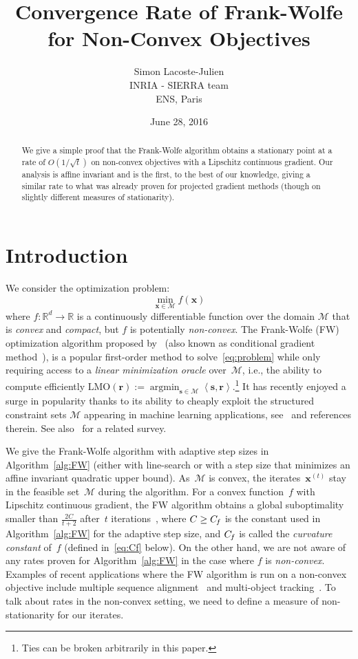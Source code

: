 \documentclass{article}
\title{Convergence Rate of Frank-Wolfe for Non-Convex Objectives}
\date{June 28, 2016}
\author{
Simon Lacoste-Julien \\
INRIA - SIERRA team\\
ENS, Paris 
}
\newcommand{\R}{\mathbb{R}}
\newcommand{\x}{\bm{x}}
\newcommand{\s}{\bm{s}}
\newcommand{\xt}{\bm{x}^{(t)}}
\DeclareMathOperator*{\argmin}{\arg\min}
\newcommand{\domain}{\mathcal{M}} %
\newcommand{\Cf}{C_{\hspace{-0.08em}f}}
\renewcommand{\r}{\bm{r}}
\newcommand{\innerProd}[2]{\left\langle #1 , #2 \right\rangle}
\newcommand{\0}{\mathbf{0}} %
\begin{document}
\maketitle

\begin{abstract}
We give a simple proof that the Frank-Wolfe algorithm obtains a stationary point at a rate of $O(1/\sqrt{t})$ on non-convex objectives with a Lipschitz continuous gradient. Our analysis is affine invariant and is the first, to the best of our knowledge, giving a similar rate to what was already proven for projected gradient methods (though on slightly different measures of stationarity).
\end{abstract}

%
%
%

\section{Introduction}
We consider the optimization problem:
\begin{equation} \label{eq:problem}
\min_{\x \in \domain} f(\x)
\end{equation}
where $f:\R^d\rightarrow\R$ is a continuously differentiable function over the domain $\domain$ that is \emph{convex} and \emph{compact}, but $f$ is potentially \emph{non-convex}. The Frank-Wolfe (FW) optimization algorithm proposed by~\citet{Frank:1956vp} (also known as conditional gradient method~\citep{demyanov1970approximate}), is a popular first-order method to solve~\eqref{eq:problem} while only requiring access to a \emph{linear minimization oracle} over~$\domain$, i.e., the ability to compute efficiently $\text{LMO}(\r) := \argmin_{\s \in \domain} \innerProd{\s}{\r}$.\footnote{Ties can be broken arbitrarily in this paper.} It has recently enjoyed a surge in popularity thanks to its ability to cheaply exploit the structured constraint sets $\domain$ appearing in machine learning applications, see~\citet{jaggi2013revisiting,lacoste2015global} and references therein. See also~\citet{lan2013FW} for a related survey.

We give the Frank-Wolfe algorithm with adaptive step sizes in Algorithm~\ref{alg:FW} (either with line-search or with a step size that minimizes an affine invariant quadratic upper bound). As~$\domain$ is convex, the iterates~$\xt$ stay in the feasible set~$\domain$ during the algorithm. For a convex function~$f$ with Lipschitz continuous gradient, the FW algorithm obtains a global suboptimality smaller than $\frac{2 C}{t+2}$ after~$t$ iterations~\citep[Theorem~1]{jaggi2013revisiting}, where $C \geq \Cf$ is the constant used in Algorithm~\ref{alg:FW} for the adaptive step size, and $\Cf$ is called the \emph{curvature constant} of~$f$ (defined in~\eqref{eq:Cf} below). On the other hand, we are not aware of any rates proven for Algorithm~\ref{alg:FW} in the case where $f$ is \emph{non-convex}. Examples of recent applications where the FW algorithm is run on a non-convex objective include multiple sequence alignment~\citep[Appendix B]{Alayrac16unsupervised} and multi-object tracking~\citep[Section~5.1]{chari15pairwise}. To talk about rates in the non-convex setting, we need to define a measure of non-stationarity for our iterates.
\end{document}
